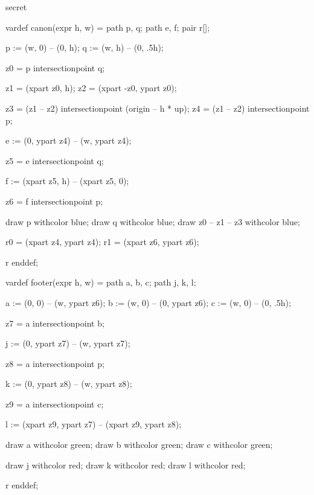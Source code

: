 



\startenvironment secret

	\startMPdefinitions
		vardef canon(expr h, w) =
			path p, q;
			path e, f;
			pair r[];

			p := (w, 0) -- (0,   h);
			q := (w, h) -- (0, .5h);

			z0 = p intersectionpoint q; %

			z1 = (xpart  z0, h); %
			z2 = (xpart -z0, ypart z0); %

			z3 = (z1 -- z2) intersectionpoint (origin -- h * up); %
			z4 = (z1 -- z2) intersectionpoint p; %

			e := (0, ypart z4) -- (w, ypart z4);

			z5 = e intersectionpoint q; %

			f := (xpart z5, h) -- (xpart z5, 0);

			z6 = f intersectionpoint p; %

			draw p withcolor blue;
			draw q withcolor blue;
			draw z0 -- z1 -- z3 withcolor blue;

			r0 = (xpart z4, ypart z4); %
			r1 = (xpart z6, ypart z6); %

			r
		enddef;

		vardef footer(expr h, w) =
			path a, b, c;
			path j, k, l;

			a := (0, 0) -- (w, ypart z6);
			b := (w, 0) -- (0, ypart z6);
			c := (w, 0) -- (0, .5h);

			z7 = a intersectionpoint b; %

			j := (0, ypart z7) -- (w, ypart z7);

			z8 = a intersectionpoint p; %

			k := (0, ypart z8) -- (w, ypart z8);

			z9 = a intersectionpoint c; %

			l := (xpart z9, ypart z7) -- (xpart z9, ypart z8);

			draw a withcolor green;
			draw b withcolor green;
			draw c withcolor green;

			draw j withcolor red; %
			draw k withcolor red; %
			draw l withcolor red; %


			r
		enddef;
	\stopMPdefinitions

\stopenvironment

